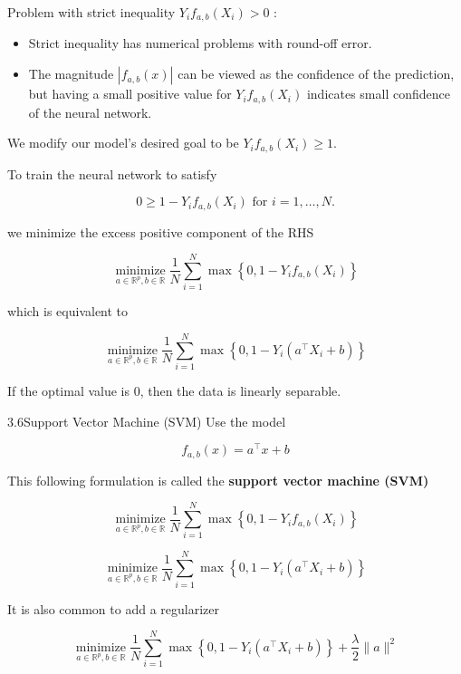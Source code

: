 \begin{frame}[allowframebreaks]
Problem with strict inequality $Y_{i} f_{a, b}\left(X_{i}\right)>0$ :

\begin{itemize}
    \item Strict inequality has numerical problems with round-off error.
    \item The magnitude $\left|f_{a, b}(x)\right|$ can be viewed as the confidence of the prediction, but having a small positive value for $Y_{i} f_{a, b}\left(X_{i}\right)$ indicates small confidence of the neural network.
\end{itemize}

We modify our model's desired goal to be $Y_{i} f_{a, b}\left(X_{i}\right) \geq 1$.

To train the neural network to satisfy

$$
0 \geq 1-Y_{i} f_{a, b}\left(X_{i}\right) \text { for } i=1, \ldots, N .
$$

we minimize the excess positive component of the RHS

$$
\underset{a \in \mathbb{R}^{p}, b \in \mathbb{R}}{\operatorname{minimize}} \frac{1}{N} \sum_{i=1}^{N} \max \left\{0,1-Y_{i} f_{a, b}\left(X_{i}\right)\right\}
$$

which is equivalent to

$$
\underset{a \in \mathbb{R}^{p}, b \in \mathbb{R}}{\operatorname{minimize}} \frac{1}{N} \sum_{i=1}^{N} \max \left\{0,1-Y_{i}\left(a^{\top} X_{i}+b\right)\right\}
$$

If the optimal value is 0, then the data is linearly separable.

\end{frame}

\begin{frame}[allowframebreaks]

\begin{mydefinitionblock}{3.6}{Support Vector Machine (SVM)}
    Use the model

    $$
    f_{a, b}(x)=a^{\top} x+b
    $$

    This following formulation is called the \textbf{support vector machine (SVM)}

    $$
    \underset{a \in \mathbb{R}^{p}, b \in \mathbb{R}}{\operatorname{minimize}} \frac{1}{N} \sum_{i=1}^{N} \max \left\{0,1-Y_{i} f_{a, b}\left(X_{i}\right)\right\}
    $$

    $$
    \underset{a \in \mathbb{R}^{p}, b \in \mathbb{R}}{\operatorname{minimize}} \frac{1}{N} \sum_{i=1}^{N} \max \left\{0,1-Y_{i}\left(a^{\top} X_{i}+b\right)\right\}
    $$

    It is also common to add a regularizer

    $$
    \underset{a \in \mathbb{R}^{p}, b \in \mathbb{R}}{\operatorname{minimize}} \frac{1}{N} \sum_{i=1}^{N} \max \left\{0,1-Y_{i}\left(a^{\top} X_{i}+b\right)\right\}+\frac{\lambda}{2}\|a\|^{2}
    $$
\end{mydefinitionblock}

\end{frame}

